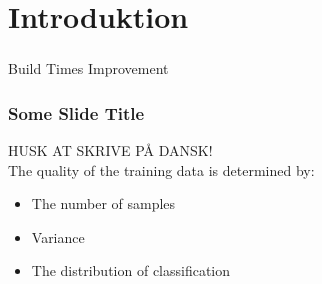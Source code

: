 \section[Introduktion]{Introduktion}

\begin{frame}
  \frametitle{}
  \begin{center}
    {\Huge Build Times Improvement}
  \end{center}
\end{frame}

\begin{frame}
    \frametitle{Some Slide Title}
    HUSK AT SKRIVE PÅ DANSK!\\
    The quality of the training data is determined by:
    \begin{itemize}
        \item The number of samples
        \item Variance
        \item The distribution of classification
    \end{itemize}
\end{frame}
